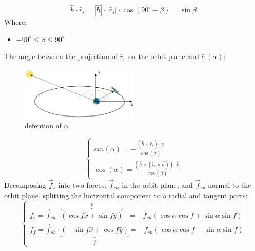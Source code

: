 \documentclass[11pt, a4paper]{article}
\begin{document}
\begin{itemize}
\begin{enumerate}
        \begin{equation}
            \hat{h}\cdot\hat{r}_s = |\hat{h}|\cdot|\hat{r}_s|\cdot\cos(90^\circ-\beta)=\sin\beta
        \end{equation}
        Where:
        \begin{itemize}
            \item $-90^\circ\leq\beta\leq90^\circ$
        \end{itemize}
        \newpage
        The angle between the projection of $\hat{r}_s$ on the orbit plane and $\hat{e}\ (\alpha)$:
        \begin{figure}[H]
        \begin{center}
        \includegraphics[width=0.5\textwidth]{images/angle between the projection of r_s on the orbit plane and eccentricity - alpha.png}
        \caption{defention of $\alpha$ \cite{SM_Tutorial_10}}
        \end{center}
        \end{figure}
        \begin{equation}
            \begin{cases}
                sin(\alpha) =\displaystyle -\frac{\left(\hat{h}\times\hat{r}_s\right)\cdot\hat{e}}{\cos(\beta)}\\
                \cos(\alpha) =\displaystyle \frac{\left(\hat{h}\times\left(\hat{r}_s\times\hat{h}\right)\right)\cdot\hat{e}}{\cos(\beta)}
            \end{cases}
        \end{equation}
        Decomposing $\vec{f}_s$ into two forces: $\vec{f}_{sh}$ in the orbit plane, and $\vec{f}_{sp}$ normal to the orbit plane. splitting the horizontal component to a radial and tangent parts:
        \begin{equation}
            \begin{cases}
                f_r = \vec{f}_{sh} \cdot \overbrace{(\cos f\hat{x}+\sin f\hat{y})}^{\hat{r}}\ \ \ = -f_{sh}(\cos \alpha \cos f + \sin\alpha \sin f)\\
                f_f = \vec{f}_{sh}\cdot \underbrace{(-\sin f\hat{x}+\cos f\hat{y})}_{\hat{f}} = -f_{sh}(\cos \alpha \cos f - \sin\alpha \sin f)
            \end{cases}

\end{equation}
\end{enumerate}
\end{itemize}
\end{document}
